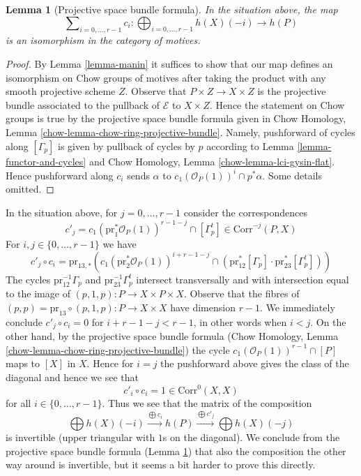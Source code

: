 \documentclass{stacks-project}
\theoremstyle{plain}
\newtheorem{lemma}[subsection]{Lemma}
\theoremstyle{definition}
\theoremstyle{remark}
\numberwithin{equation}{subsection}
\begin{document}
\begin{lemma}[Projective space bundle formula]
\label{lemma-projective-space-bundle-formula}
In the situation above, the map
$$
\sum\nolimits_{i = 0, \ldots, r - 1} c_i :
\bigoplus\nolimits_{i = 0, \ldots, r - 1} h(X)(-i)
\longrightarrow
h(P)
$$
is an isomorphism in the category of motives.
\end{lemma}

\begin{proof}
By Lemma \ref{lemma-manin} it suffices to show that
our map defines an isomorphism on Chow groups of motives
after taking the product with any smooth projective scheme $Z$.
Observe that $P \times Z \to X \times Z$ is the projective
bundle associated to the pullback of $\mathcal{E}$ to $X \times Z$.
Hence the statement on Chow groups is true by the projective space bundle
formula given in
Chow Homology, Lemma \ref{chow-lemma-chow-ring-projective-bundle}.
Namely, pushforward of cycles along $[\Gamma_p]$ is given by pullback
of cycles by $p$ according to Lemma \ref{lemma-functor-and-cycles} and
Chow Homology, Lemma \ref{chow-lemma-lci-gysin-flat}. Hence pushforward
along $c_i$ sends $\alpha$ to $c_1(\mathcal{O}_P(1))^i \cap p^*\alpha$.
Some details omitted.
\end{proof}

\noindent
In the situation above, for $j = 0, \ldots, r - 1$ consider
the correspondences
$$
c'_j = c_1(\text{pr}_1^*\mathcal{O}_P(1))^{r - 1 - j} \cap [\Gamma_p^t] \in
\text{Corr}^{-j}(P, X)
$$
For $i, j \in \{0, \ldots, r - 1\}$ we have
$$
c'_j \circ c_i =
\text{pr}_{13, *}\left(
c_1(\text{pr}_2^*\mathcal{O}_P(1))^{i + r - 1 - j} \cap
(\text{pr}_{12}^*[\Gamma_p] \cdot \text{pr}_{23}^*[\Gamma_p^t])
\right)
$$
The cycles $\text{pr}_{12}^{-1}\Gamma_p$ and 
$\text{pr}_{23}^{-1}\Gamma_p^t$ intersect transversally and
with intersection equal to the image of
$(p, 1, p) : P \to X \times P \times X$.
Observe that the fibres of
$(p, p) = \text{pr}_{13} \circ (p, 1, p) : P \to X \times X$
have dimension $r - 1$. We immediately conclude
$c'_j \circ c_i = 0$ for $i + r - 1 - j < r - 1$, in other words when $i < j$.
On the other hand, by the projective space bundle formula
(Chow Homology, Lemma \ref{chow-lemma-chow-ring-projective-bundle})
the cycle $c_1(\mathcal{O}_P(1))^{r - 1} \cap [P]$ maps
to $[X]$ in $X$. Hence for $i = j$ the pushforward above
gives the class of the diagonal and hence
we see that
$$
c'_i \circ c_i = 1 \in \text{Corr}^0(X, X)
$$
for all $i \in \{0, \ldots, r - 1\}$. Thus we see that the matrix
of the composition
$$
\bigoplus h(X)(-i)
\xrightarrow{\bigoplus c_i}
h(P)
\xrightarrow{\bigoplus c'_j}
\bigoplus h(X)(-j)
$$
is invertible (upper triangular with $1$s on the diagonal).
We conclude from the projective space bundle formula
(Lemma \ref{lemma-projective-space-bundle-formula})
that also the composition the other way around is
invertible, but it seems a bit harder to prove this directly.
\end{document}
